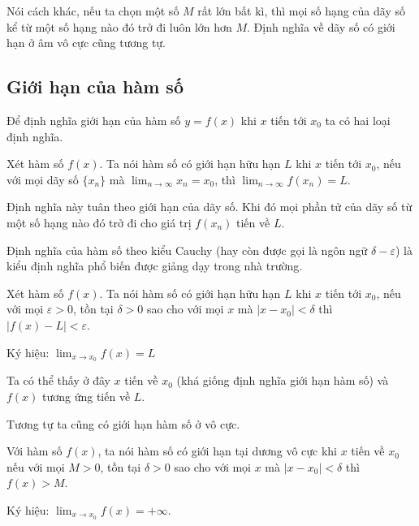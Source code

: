 \documentclass{mynotes}
\begin{document}
Nói cách khác, nếu ta chọn một số $M$ rất lớn bất kì, thì mọi số hạng của dãy số kể từ một số hạng nào đó trở đi luôn lớn hơn $M$. Định nghĩa về dãy số có giới hạn ở âm vô cực cũng tương tự.

\subsection*{Giới hạn của hàm số}

Để định nghĩa giới hạn của hàm số $y = f(x)$ khi $x$ tiến tới $x_0$ ta có hai loại định nghĩa.

\begin{definition}
    Xét hàm số $f(x)$. Ta nói hàm số có giới hạn hữu hạn $L$ khi $x$ tiến tới $x_0$, nếu với mọi dãy số $\{x_n\}$ mà $\displaystyle{\lim_{n \to \infty} x_n = x_0}$, thì  $\displaystyle{\lim_{n \to \infty} f(x_n) = L}$.
\end{definition}

Định nghĩa này tuân theo giới hạn của dãy số. Khi đó mọi phần tử của dãy số từ một số hạng nào đó trở đi cho giá trị $f(x_n)$ tiến về $L$.

Định nghĩa của hàm số theo kiểu Cauchy (hay còn được gọi là ngôn ngữ $\delta-\varepsilon$) là kiểu định nghĩa phổ biến được giảng dạy trong nhà trường.

\begin{definition}
    Xét hàm số $f(x)$. Ta nói hàm số có giới hạn hữu hạn $L$ khi $x$ tiến tới $x_0$, nếu với mọi $\varepsilon > 0$, tồn tại  $\delta > 0$ sao cho với mọi $x$ mà $| x - x_0 | < \delta$ thì $|f(x) - L| < \varepsilon$.

    Ký hiệu: $\displaystyle{\lim_{x \to x_0} f(x) = L}$
\end{definition}


Ta có thể thấy ở đây $x$ tiến về $x_0$ (khá giống định nghĩa giới hạn hàm số) và $f(x)$ tương ứng tiến về $L$.

Tương tự ta cũng có giới hạn hàm số ở vô cực.

\begin{definition}
    Với hàm số $f(x)$, ta nói hàm số có giới hạn tại dương vô cực khi $x$ tiến về $x_0$ nếu với mọi $M > 0$, tồn tại $\delta > 0$ sao cho với mọi $x$ mà $|x - x_0| < \delta$ thì $f(x) > M$.

    Ký hiệu: $\displaystyle{\lim_{x \to x_0} f(x) = +\infty}$.
\end{definition}
\end{document}
